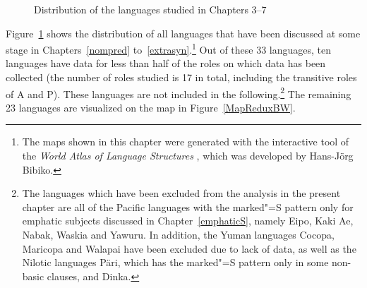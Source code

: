 \begin{figure}[h,t,b] \centering {}
\caption{Distribution of the languages studied in Chapters 3--7}\label{MapFullBW}
\end{figure}

Figure~\ref{MapFullBW} shows the distribution of all languages that have been discussed at some stage in Chapters~\ref{nompred} to~\ref{extrasyn}.\footnote{The maps shown in this chapter were generated with the interactive tool of the \textit{World Atlas of Language Structures} \citep{WALS}, which was developed by Hans-J\"org Bibiko.} 
Out of these 33 languages, ten languages have data for less than half of the  roles on which data has been collected (the number of roles studied is 17 in total, including the transitive roles of A and P). 
These languages are not included in the following.\footnote{The languages which have been excluded from the analysis in the present chapter are all of the Pacific languages with the marked"=S pattern only for emphatic subjects discussed in Chapter~\ref{emphaticS}, namely Eipo, Kaki Ae, Nabak, Waskia and Yawuru. In addition, the Yuman languages Cocopa, Maricopa and Walapai have been excluded due to lack of data, as well as the Nilotic languages P\"ari, which has the marked"=S pattern only in some non-basic clauses, and Dinka.} 
The remaining 23 languages are visualized on the map in Figure~\ref{MapReduxBW}.

